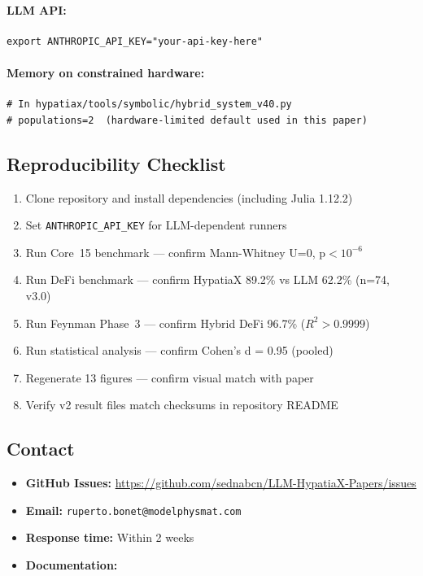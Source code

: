 \documentclass[11pt,a4paper]{article}
\begin{document}
\paragraph{LLM API:}
\begin{small}
\begin{verbatim}
export ANTHROPIC_API_KEY="your-api-key-here"
\end{verbatim}
\end{small}

\paragraph{Memory on constrained hardware:}
\begin{small}
\begin{verbatim}
# In hypatiax/tools/symbolic/hybrid_system_v40.py
# populations=2  (hardware-limited default used in this paper)
\end{verbatim}
\end{small}

\subsection{Reproducibility Checklist}

\begin{enumerate}
\item Clone repository and install dependencies (including Julia 1.12.2)
\item Set \texttt{ANTHROPIC\_API\_KEY} for LLM-dependent runners
\item Run Core~15 benchmark — confirm Mann-Whitney U=0, p$<10^{-6}$
\item Run DeFi benchmark — confirm HypatiaX 89.2\% vs LLM 62.2\% (n=74, v3.0)
\item Run Feynman Phase~3 — confirm Hybrid DeFi 96.7\% ($R^2>0.9999$)
\item Run statistical analysis — confirm Cohen's d = 0.95 (pooled)
\item Regenerate 13 figures — confirm visual match with paper
\item Verify v2 result files match checksums in repository README
\end{enumerate}

\subsection{Contact}

\begin{itemize}
\item \textbf{GitHub Issues:} \url{https://github.com/sednabcn/LLM-HypatiaX-Papers/issues}
\item \textbf{Email:} \texttt{ruperto.bonet@modelphysmat.com}
\item \textbf{Response time:} Within 2 weeks
\item \textbf{Documentation:} 
\end{itemize}
\end{document}
